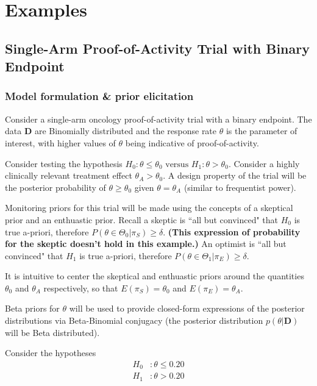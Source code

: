 \documentclass[12pt]{article}
\begin{document}
\section{Examples}

\subsection{Single-Arm Proof-of-Activity Trial with Binary Endpoint}

\subsubsection{Model formulation \& prior elicitation}

Consider a single-arm oncology proof-of-activity trial with a binary endpoint. The data $\mathbf{D}$ are Binomially distributed and the response rate $\theta$ is the parameter of interest, with higher values of $\theta$ being indicative of proof-of-activity.

Consider testing the hypothesis $H_0:\theta\leq\theta_0\text{ versus }H_1:\theta>\theta_0$. Consider a highly clinically relevant treatment effect $\theta_A>\theta_0$. A design property of the trial will be the posterior probability of $\theta\geq\theta_0$ given $\theta=\theta_A$ (similar to frequentist power).

Monitoring priors for this trial will be made using the concepts of a skeptical prior and an enthuastic prior. Recall a skeptic is ``all but convinced" that $H_0$ is true a-priori, therefore $P(\theta\in\Theta_0|\pi_S)\geq\delta$. \textbf{(This expression of probability for the skeptic doesn't hold in this example.)} An optimist is ``all but convinced" that $H_1$ is true a-priori, therefore $P(\theta\in\Theta_1|\pi_E)\geq\delta$.

It is intuitive to center the skeptical and enthuastic priors around the quantities $\theta_0$ and $\theta_A$ respectively, so that $E(\pi_S)=\theta_0$ and $E(\pi_E)=\theta_A$.

Beta priors for $\theta$ will be used to provide closed-form expressions of the posterior distributions via Beta-Binomial conjugacy (the posterior distribution $p(\theta|\mathbf{D})$ will be Beta distributed). 

Consider the hypotheses
\begin{align*}
H_0&:\theta\leq 0.20\\
H_1&:\theta>0.20
\end{align*}
\end{document}
